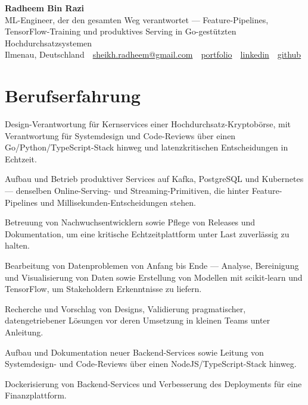 \documentclass[11pt,a4paper]{resume}
\makeatletter
\newcommand{\Portfolio}{https://radheem.github.io/my-cv}
\newcommand{\PortfolioText}{portfolio}
\newcommand{\GitHub}{https://github.com/radheem}
\newcommand{\LinkedIn}{https://www.linkedin.com/in/radheem-razi}
\newcommand{\Email}{sheikh.radheem@gmail.com}
\makeatother
\begin{document}
\clearpage
{}

\begin{center}
  {\huge\bfseries Radheem Bin Razi}\\[3pt]
  {\large ML-Engineer, der den gesamten Weg verantwortet — Feature-Pipelines, TensorFlow-Training und produktives Serving in Go-gestützten Hochdurchsatzsystemen}\\[6pt]
  \small
  Ilmenau, Deutschland \,\textbar\,
  \href{mailto:\Email}{\Email} \,\textbar\,
  \href{\Portfolio}{\PortfolioText} \,\textbar\,
  \href{\LinkedIn}{linkedin} \,\textbar\,
  \href{\GitHub}{github}
\end{center}
\vspace{2pt}

\section{Berufserfahrung}

\bullets
  \item Design-Verantwortung für Kernservices einer Hochdurchsatz-Kryptobörse, mit Verantwortung für Systemdesign und Code-Reviews über einen Go/Python/TypeScript-Stack hinweg und latenzkritischen Entscheidungen in Echtzeit.
  \item Aufbau und Betrieb produktiver Services auf Kafka, PostgreSQL und Kubernetes — denselben Online-Serving- und Streaming-Primitiven, die hinter Feature-Pipelines und Millisekunden-Entscheidungen stehen.
  \item Betreuung von Nachwuchsentwicklern sowie Pflege von Releases und Dokumentation, um eine kritische Echtzeitplattform unter Last zuverlässig zu halten.
\bulletsend
\vspace{3pt}
\bullets
  \item Bearbeitung von Datenproblemen von Anfang bis Ende — Analyse, Bereinigung und Visualisierung von Daten sowie Erstellung von Modellen mit scikit-learn und TensorFlow, um Stakeholdern Erkenntnisse zu liefern.
  \item Recherche und Vorschlag von Designs, Validierung pragmatischer, datengetriebener Lösungen vor deren Umsetzung in kleinen Teams unter Anleitung.
\bulletsend
\vspace{3pt}
\bullets
  \item Aufbau und Dokumentation neuer Backend-Services sowie Leitung von Systemdesign- und Code-Reviews über einen NodeJS/TypeScript-Stack hinweg.
  \item Dockerisierung von Backend-Services und Verbesserung des Deployments für eine Finanzplattform.
\bulletsend
\vspace{3pt}
\end{document}
